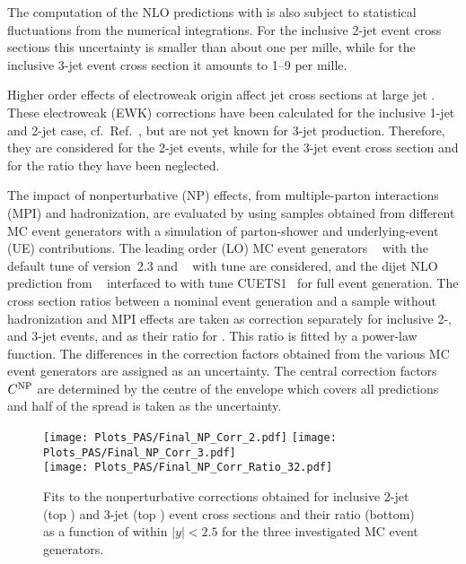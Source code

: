 The computation of the NLO predictions with \NLOJETPP is also subject
to statistical fluctuations from the numerical integrations.  For the
inclusive 2-jet event cross sections this uncertainty is smaller than
about one per mille, while for the inclusive 3-jet event cross section
it amounts to 1--9 per mille.

Higher order effects of electroweak origin affect jet cross sections at large
jet \pt. These electroweak (EWK) corrections have been calculated for
the inclusive 1-jet and 2-jet case, cf.\ Ref.~\cite{Dittmaier:2012kx},
but are not yet known for 3-jet production. Therefore, they are
considered for the 2-jet events, while for the 3-jet event cross
section and for the ratio they have been neglected.

The impact of nonperturbative (NP) effects, \ie from multiple-parton
interactions (MPI) and hadronization, are evaluated by using samples
obtained from different MC event generators with a simulation of
parton-shower and underlying-event (UE) contributions. The leading
order (LO) MC event generators \HERWIGPP~\cite{Bahr:2008pv} with the
default tune of version~2.3 and \PYTHIAS~\cite{Sjostrand:2006za} with
tune \Ztwostar are considered, and the dijet NLO prediction from
\POWHEG~\cite{Nason:2004rx, Frixione:2007vw, Alioli:2010xa} interfaced
to \PYTHIAE with tune CUETS1~\cite{Khachatryan:2015pea} for full event
generation. The cross section ratios between a nominal event
generation and a sample without hadronization and MPI effects are
taken as correction separately for inclusive 2-, and 3-jet events, and
as their ratio for \ratio. This ratio is fitted by a power-law
function. The differences in the correction factors obtained from the
various MC event generators are assigned as an uncertainty. The
central correction factors $C^{\mathrm{\tiny{NP}}}$ are determined by
the centre of the envelope which covers all predictions and half of
the spread is taken as the uncertainty.

\begin{figure}[h]
  \hftwo\texttt{[image: Plots\_PAS/Final\_NP\_Corr\_2.pdf]}\hftwo%
  \texttt{[image: Plots\_PAS/Final\_NP\_Corr\_3.pdf]}\hftwo\\
  \hftwo\texttt{[image: Plots\_PAS/Final\_NP\_Corr\_Ratio\_32.pdf]}\hftwo
  \caption{Fits to the nonperturbative corrections obtained for
    inclusive 2-jet (top \cmsLeft) and 3-jet (top \cmsRight) event
    cross sections and their ratio \ratio (bottom) as a function of
    \httwo within $|y|<2.5$ for the three investigated MC event
    generators.}
  \label{fig:np_factors}
\end{figure}

